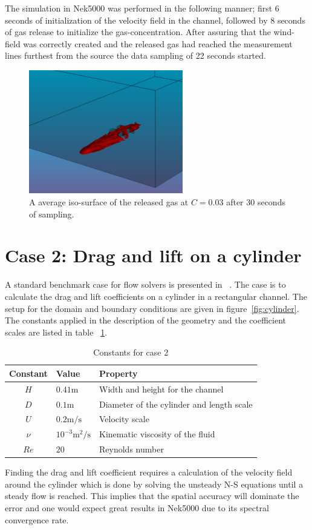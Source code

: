 The simulation in Nek5000 was performed in the following manner; first 6 seconds of initialization of the velocity field in the 
channel, followed by 8 seconds of gas release to initialize the gas-concentration. After assuring that the wind-field was 
correctly created and the released gas had reached the measurement lines furthest from the source the data sampling of 22 seconds 
started.
%
\begin{figure}[h]
	\centering
	\includegraphics[width=0.6\textwidth]{Figures/plume.png}
	\caption{A average iso-surface of the released gas at $C=0.03$ 
    after 30 seconds of sampling.}
	\label{fig:plume}
\end{figure}
%

\section{Case 2: Drag and lift on a cylinder}
A standard benchmark case for flow solvers is presented in ~\cite{benchmark}. 
The case is to calculate the drag and lift coefficients on a cylinder in a rectangular channel.
The setup for the domain and boundary conditions are given in figure~\ref{fig:cylinder}.
The constants applied in the description of the geometry and the coefficient scales are listed 
in table ~\ref{tab:case2consts}.
%
\begin{table}[h]
    \centering
    \begin{tabular}{c l l}
     Constant & Value & Property \\ \hline
    $H$ & $0.41\text{m}$ & Width and height for the channel \\
    $D$ & $0.1\text{m}$ & Diameter of the cylinder and length scale \\
    $U$ & $0.2\text{m/s}$ & Velocity scale \\
    $\nu$ &  $ 10^{-3}\text{m$^2$/s}$ & Kinematic viscosity of the fluid \\
    $Re$ & $20$ & Reynolds number \\ 
    \end{tabular}
    \caption{Constants for case 2}
    \label{tab:case2consts}
\end{table}
%
Finding the drag and lift coefficient requires a calculation of the velocity field around the cylinder
which is done by solving the unsteady N-S equations until a steady flow is reached. This implies that the
spatial accuracy will dominate the error and one would expect great results in Nek5000 
due to its spectral convergence rate.

